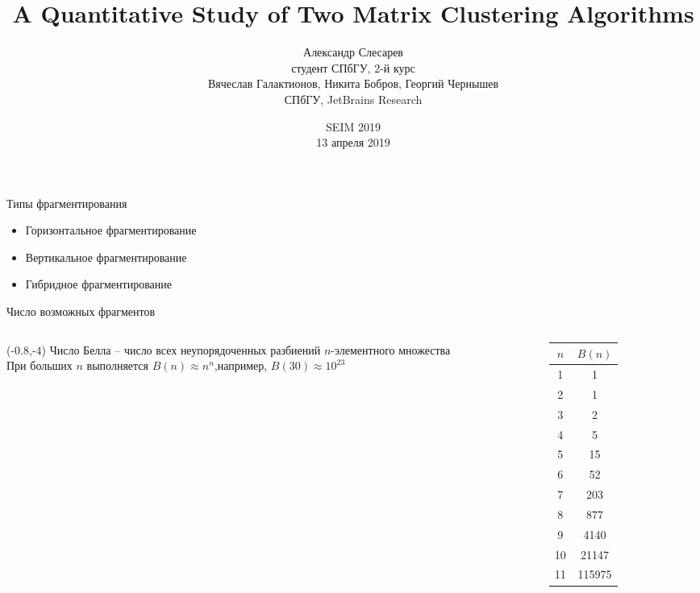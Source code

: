 \documentclass[10pt, dvipsnames]{beamer}
\title{A Quantitative Study of Two Matrix Clustering Algorithms}
\author{{Александр Слесарев}%
		\\
		студент СПбГУ, 2-й курс\\[0.1cm]
		Вячеслав Галактионов,\;%
		Никита Бобров,\;%
		Георгий Чернышев%
		\\
		СПбГУ, JetBrains Research
		}
\date[SEIM 2019]{SEIM 2019\\ 13 апреля 2019}
\begin{document}
\maketitle

\begin{frame}{Типы фрагментирования}
	\begin{itemize}
	\item Горизонтальное фрагментирование\\[0.4cm]
	\item Вертикальное фрагментирование\\[0.4cm]
	\item Гибридное фрагментирование\\[0.4cm]
	\end{itemize}
\end{frame}

\begin{frame}{Число возможных фрагментов}
	\begin{columns}
		\begin{column}{0.5\textwidth}
			\begin{textblock}{10}(-0.8,-4)
Число Белла -- число всех неупорядоченных разбиений $n$-элементного множества 
\\[0.5cm]
При больших $n$ выполняется $B(n) \approx n^{n}$,\newline например, $B(30) \approx 10^{23}$
			\end{textblock}
		\end{column}
		\begin{column}{0.2\textwidth}
			\begin{tabular}{|c|c|}
				\hline
				$n$ & $B(n)$\\ \hline
				1   & 1     \\ \hline
				2   & 1     \\ \hline
				3   & 2     \\ \hline
				4   & 5     \\ \hline
				5   & 15    \\ \hline
				6   & 52    \\ \hline
				7   & 203   \\ \hline
				8   & 877   \\ \hline
				9   & 4140  \\ \hline
			   10   & 21147 \\ \hline
			   11  & 115975 \\ \hline
			\end{tabular}
		\end{column}
	\end{columns}	
\end{frame}
\end{document}
